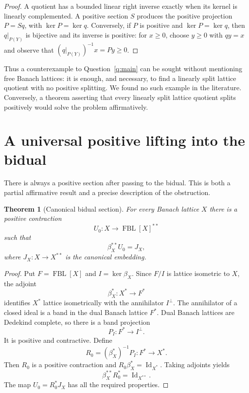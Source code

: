 \documentclass[11pt]{article}
\newtheorem{theorem}{Theorem}[section]
\newcommand{\FBL}{\operatorname{FBL}}
\newcommand{\Id}{\operatorname{Id}}
\begin{document}
\begin{proof}
A quotient has a bounded linear right inverse exactly when its kernel is
linearly complemented.  A positive section $S$ produces the positive
projection $P=Sq$, with $\ker P=\ker q$.  Conversely, if $P$ is positive and
$\ker P=\ker q$, then $q|_{P(Y)}$ is bijective and its inverse is positive:
for $x\geq0$, choose $y\geq0$ with $qy=x$ and observe that
$(q|_{P(Y)})^{-1}x=Py\geq0$.
\end{proof}

Thus a counterexample to Question~\ref{q:main} can be sought without mentioning free
Banach lattices: it is enough, and necessary, to find a linearly split lattice
quotient with no positive splitting.  We found no such example in the
literature.  Conversely, a theorem asserting that every linearly split lattice
quotient splits positively would solve the problem affirmatively.

\section{A universal positive lifting into the bidual}

There is always a positive section after passing to the bidual.  This is both a
partial affirmative result and a precise description of the obstruction.

\begin{theorem}[Canonical bidual section]\label{thm:bidual}
For every Banach lattice $X$ there is a positive contraction
\[
 U_0:X\longrightarrow\FBL[X]^{**}
\]
such that
\[
 \beta_X^{**}U_0=J_X,
\]
where $J_X:X\to X^{**}$ is the canonical embedding.
\end{theorem}

\begin{proof}
Put $F=\FBL[X]$ and $I=\ker\beta_X$.  Since $F/I$ is lattice isometric to
$X$, the adjoint
\[
 \beta_X^*:X^*\longrightarrow F^*
\]
identifies $X^*$ lattice isometrically with the annihilator $I^\perp$.  The
annihilator of a closed ideal is a band in the dual Banach lattice $F^*$.
Dual Banach lattices are Dedekind complete, so there is a band projection
\[
 P_I:F^*\longrightarrow I^\perp.
\]
It is positive and contractive.  Define
\[
 R_0=(\beta_X^*)^{-1}P_I:F^*\longrightarrow X^*.
\]
Then $R_0$ is a positive contraction and $R_0\beta_X^*=\Id_{X^*}$.  Taking
adjoints yields
\[
 \beta_X^{**}R_0^*=\Id_{X^{**}}.
\]
The map $U_0=R_0^*J_X$ has all the required properties.
\end{proof}
\end{document}
